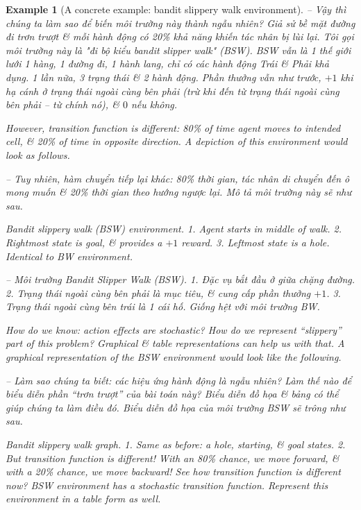\documentclass{article}
\newtheorem{example}{Example}
\begin{document}
\begin{itemize}
\begin{itemize}
\begin{itemize}
\begin{example}[A concrete example: bandit slippery walk environment]
                -- Vậy thì chúng ta làm sao để biến môi trường này thành ngẫu nhiên? Giả sử bề mặt đường đi trơn trượt \& mỗi hành động có 20\% khả năng khiến tác nhân bị lùi lại. Tôi gọi môi trường này là "đi bộ kiểu bandit slipper walk" (BSW). BSW vẫn là 1 thế giới lưới 1 hàng, 1 đường đi, 1 hành lang, chỉ có các hành động Trái \& Phải khả dụng. 1 lần nữa, 3 trạng thái \& 2 hành động. Phần thưởng vẫn như trước, $+1$ khi hạ cánh ở trạng thái ngoài cùng bên phải (trừ khi đến từ trạng thái ngoài cùng bên phải -- từ chính nó), \& $0$ nếu không.

                However, transition function is different: 80\% of time agent moves to intended cell, \& 20\% of time in opposite direction. A depiction of this environment would look as follows.

                -- Tuy nhiên, hàm chuyển tiếp lại khác: 80\% thời gian, tác nhân di chuyển đến ô mong muốn \& 20\% thời gian theo hướng ngược lại. Mô tả môi trường này sẽ như sau.

                {\sf Bandit slippery walk (BSW) environment.} 1. Agent starts in middle of walk. 2. Rightmost state is goal, \& provides a $+1$ reward. 3. Leftmost state is a hole. Identical to BW environment.

                -- {\sf Môi trường Bandit Slipper Walk (BSW).} 1. Đặc vụ bắt đầu ở giữa chặng đường. 2. Trạng thái ngoài cùng bên phải là mục tiêu, \& cung cấp phần thưởng $+1$. 3. Trạng thái ngoài cùng bên trái là 1 cái hố. Giống hệt với môi trường BW.

                How do we know: action effects are stochastic? How do we represent ``slippery'' part of this problem? Graphical \& table representations can help us with that. A graphical representation of the BSW environment would look like the following.

                -- Làm sao chúng ta biết: các hiệu ứng hành động là ngẫu nhiên? Làm thế nào để biểu diễn phần ``trơn trượt'' của bài toán này? Biểu diễn đồ họa \& bảng có thể giúp chúng ta làm điều đó. Biểu diễn đồ họa của môi trường BSW sẽ trông như sau.

                {\sf Bandit slippery walk graph.} 1. Same as before: a hole, starting, \& goal states. 2. But transition function is different! With an 80\% chance, we move forward, \& with a 20\% chance, we move backward! See how transition function is different now? BSW environment has a stochastic transition function. Represent this environment in a table form as well.


\end{example}
\end{itemize}
\end{itemize}
\end{itemize}
\end{document}
